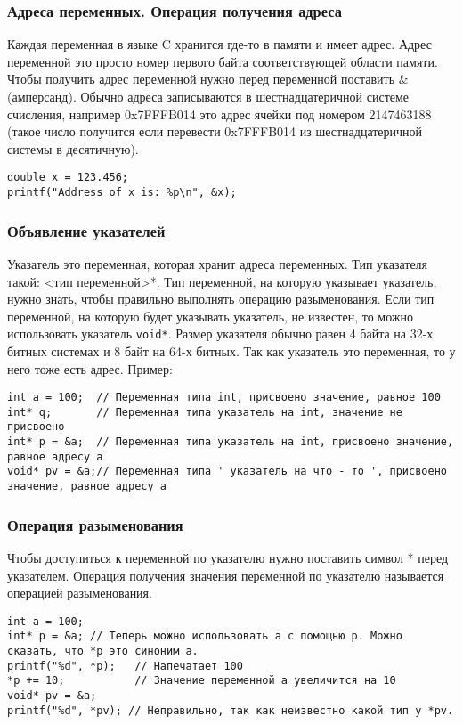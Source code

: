 \documentclass{article}
\begin{document}
\subsubsection*{Адреса переменных. Операция получения адреса}
Каждая переменная в языке C хранится где-то в памяти и имеет адрес. Адрес переменной это просто номер первого байта соответствующей области памяти.  Чтобы получить адрес переменной нужно перед переменной поставить \&(амперсанд). Обычно адреса записываются в шестнадцатеричной системе счисления, например 0x7FFFB014 это адрес ячейки под номером 2147463188 (такое число получится если перевести 0x7FFFB014 из шестнадцатеричной системы в десятичную).
\begin{lstlisting}
double x = 123.456;
printf("Address of x is: %p\n", &x);
\end{lstlisting}

\subsubsection*{Объявление указателей}
Указатель это переменная, которая хранит адреса переменных. Тип указателя такой: <тип переменной>*. Тип переменной, на которую указывает указатель, нужно знать, чтобы правильно выполнять операцию разыменования. Если тип переменной, на которую будет указывать указатель, не известен, то можно использовать указатель \texttt{void*}. Размер указателя обычно равен 4 байта на 32-х битных системах и 8 байт на 64-х битных. Так как указатель это переменная, то у него тоже есть адрес. Пример:
\begin{lstlisting}
int a = 100;  // Переменная типа int, присвоено значение, равное 100
int* q;       // Переменная типа указатель на int, значение не присвоено
int* p = &a;  // Переменная типа указатель на int, присвоено значение, равное адресу a
void* pv = &a;// Переменная типа ' указатель на что - то ', присвоено значение, равное адресу a
\end{lstlisting}

\subsubsection*{Операция разыменования}
Чтобы доступиться к переменной по указателю нужно поставить символ * перед указателем. Операция получения значения переменной по указателю называется операцией разыменования.
\begin{lstlisting}
int a = 100;
int* p = &a; // Теперь можно использовать a с помощью p. Можно сказать, что *p это синоним a.
printf("%d", *p);   // Напечатает 100
*p += 10;           // Значение переменной a увеличится на 10
void* pv = &a;
printf("%d", *pv); // Неправильно, так как неизвестно какой тип у *pv.
\end{lstlisting}
\end{document}
